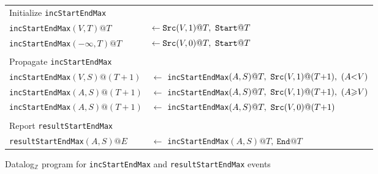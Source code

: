 \begin{figure}[h!]
\begin{mdframed}[leftmargin=0pt,rightmargin=0mm]
\begin{small}
\begin{tabular}{ll}
\multicolumn{2}{l}{Initialize \texttt{incStartEndMax}}\\
\texttt{incStartEndMax}$(V, T)@T$ & $\leftarrow \mbox{\tt Src}(V,1)@T,\ \texttt{Start}@T$\\
\texttt{incStartEndMax}$(-\infty, T)@T$ & $\leftarrow \mbox{\tt Src}(V,0)@T,\ \texttt{Start}@T$\\
& \\
\multicolumn{2}{l}{Propagate \texttt{incStartEndMax}}\\
\texttt{incStartEndMax}$(V, S)@(T{+}1)$ & $\leftarrow$ \texttt{incStartEndMax}$(A, S)@T ,\  \mbox{\tt Src}(V,1)@(T{+}1) ,\  (A {<} V)$\\
\texttt{incStartEndMax}$(A, S)@(T{+}1)$ & $\leftarrow$ \texttt{incStartEndMax}$(A, S)@T ,\  \mbox{\tt Src}(V,1)@(T{+}1) ,\  (A {\geq} V)$\\
\texttt{incStartEndMax}$(A, S)@(T{+}1)$ & $\leftarrow$ \texttt{incStartEndMax}$(A, S)@T ,\  \mbox{\tt Src}(V,0)@(T{+}1)$\\
& \\
\multicolumn{2}{l}{Report \texttt{resultStartEndMax}}\\
\texttt{resultStartEndMax}$(A, S)@E$ & $\leftarrow$ \texttt{incStartEndMax}$(A, S)@T,\ \texttt{End}@T$\\
\end{tabular}
\end{small}
\end{mdframed}
\caption{Datalog$_{\mathbb{Z}}$ program for \texttt{incStartEndMax} and \texttt{resultStartEndMax} events}
 \label{fig:start-end-max-program}
\end{figure}

